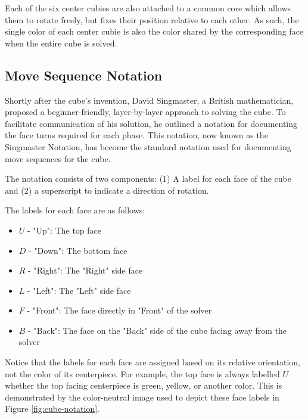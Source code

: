 Each of the six center cubies are also attached to a common core which
allows them to rotate freely, but fixes their position relative to each
other. As such, the single color of each center cubie is also the color
shared by the corresponding face when the entire cube is solved.

\subsection{Move Sequence Notation}
\label{subsec:algorithm-notation}

Shortly after the cube's invention, David Singmaster, a British
mathematician, proposed a beginner-friendly, layer-by-layer approach to
solving the cube. To facilitate communication of his solution, he
outlined a notation for documenting the face turns required for each
phase. This notation, now known as the Singmaster Notation, has become
the standard notation used for documenting move sequences for the cube.
\cite{singmaster-notation}

The notation consists of two components: (1) A label for each face of the
cube and (2) a superscript to indicate a direction of rotation.

The labels for each face are as follows:

\begin{itemize}
    \item $U$ - "Up": The top face
    \item $D$ - "Down": The bottom face
    \item $R$ - "Right": The "Right" side face
    \item $L$ - "Left": The "Left" side face
    \item $F$ - "Front": The face directly in "Front" of the solver
    \item $B$ - "Back": The face on the "Back" side of the cube facing away from the solver
\end{itemize}

Notice that the labels for each face are assigned based on its relative
orientation, not the color of its centerpiece. For example, the top
face is always labelled $U$ whether the top facing centerpiece is
green, yellow, or another color. This is demonstrated by the
color-neutral image used to depict these face labels in Figure
\ref{fig:cube-notation}.

